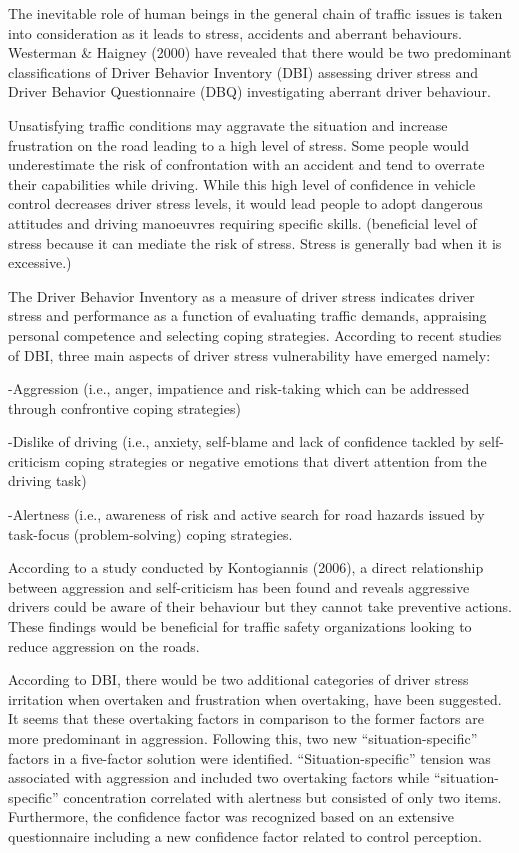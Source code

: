\documentclass[
11pt, %
oneside, %
english, %
singlespacing, %
]{macthesis} %
\begin{document}
The inevitable role of human beings in the general chain of traffic issues is taken into consideration as it leads to stress, accidents and aberrant behaviours. Westerman \& Haigney (2000) have revealed that there would be two predominant classifications of Driver Behavior Inventory (DBI) assessing driver stress and Driver Behavior Questionnaire (DBQ) investigating aberrant driver behaviour.

Unsatisfying traffic conditions may aggravate the situation and increase frustration on the road leading to a high level of stress. Some people would underestimate the risk of confrontation with an accident and tend to overrate their capabilities while driving. While this high level of confidence in vehicle control decreases driver stress levels, it would lead people to adopt dangerous attitudes and driving manoeuvres requiring specific skills. (beneficial level of stress because it can mediate the risk of stress. Stress is generally bad when it is excessive.)

The Driver Behavior Inventory as a measure of driver stress indicates driver stress and performance as a function of evaluating traffic demands, appraising personal competence and selecting coping strategies. According to recent studies of DBI, three main aspects of driver stress vulnerability have emerged namely:

-Aggression (i.e., anger, impatience and risk-taking which can be addressed through confrontive coping strategies)

-Dislike of driving (i.e., anxiety, self-blame and lack of confidence tackled by self-criticism coping strategies or negative emotions that divert attention from the driving task)

-Alertness (i.e., awareness of risk and active search for road hazards issued by task-focus (problem-solving) coping strategies.

According to a study conducted by Kontogiannis (2006), a direct relationship between aggression and self-criticism has been found and reveals aggressive drivers could be aware of their behaviour but they cannot take preventive actions. These findings would be beneficial for traffic safety organizations looking to reduce aggression on the roads.

According to DBI, there would be two additional categories of driver stress irritation when overtaken and frustration when overtaking, have been suggested. It seems that these overtaking factors in comparison to the former factors are more predominant in aggression. Following this, two new ``situation-specific'' factors in a five-factor solution were identified. ``Situation-specific'' tension was associated with aggression and included two overtaking factors while ``situation-specific'' concentration correlated with alertness but consisted of only two items. Furthermore, the confidence factor was recognized based on an extensive questionnaire including a new confidence factor related to control perception.
\end{document}
